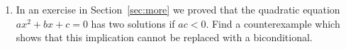 \begin{enumerate}
\wbvfill



\item In an exercise in Section~\ref{sec:more} we proved that the quadratic 
equation $ax^2 + bx + c = 0$ has two solutions if $ac < 0$.  Find a counterexample which shows that this implication cannot be replaced with a biconditional.  


\wbvfill

\end{enumerate}
